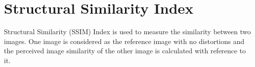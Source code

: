 \appendix
\section{Structural Similarity Index}

Structural Similarity (SSIM) Index is used to measure the similarity between two images.
One image is considered as the reference image with no distortions and the perceived image similarity of the other image is calculated with reference to it.
